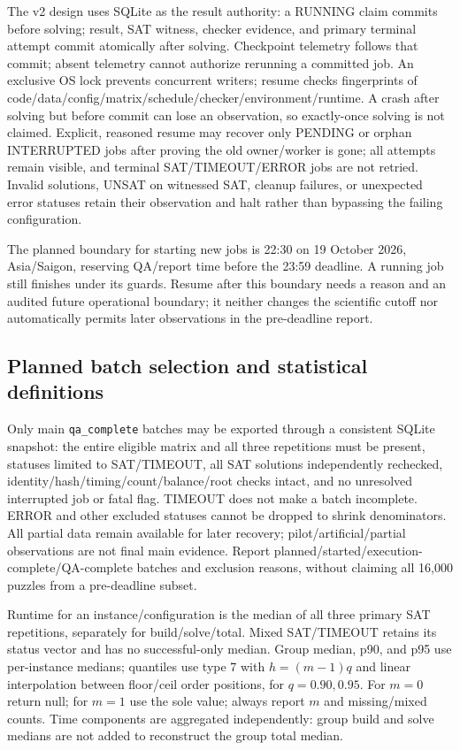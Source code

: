 The v2 design uses SQLite as the result authority: a RUNNING claim commits
before solving; result, SAT witness, checker evidence, and primary terminal
attempt commit atomically after solving. Checkpoint telemetry follows that
commit; absent telemetry cannot authorize rerunning a committed job. An
exclusive OS lock prevents concurrent writers; resume checks fingerprints
of code/data/config/matrix/schedule/checker/environment/runtime. A crash after
solving but before commit can lose an observation, so exactly-once solving
is not claimed. Explicit, reasoned resume may recover only PENDING or orphan
INTERRUPTED jobs after proving the old owner/worker is gone; all attempts
remain visible, and terminal SAT/TIMEOUT/ERROR jobs are not retried. Invalid
solutions, UNSAT on witnessed SAT, cleanup failures, or unexpected error
statuses retain their observation and halt rather than bypassing the failing
configuration.

The planned boundary for starting new jobs is 22:30 on 19 October 2026,
Asia/Saigon, reserving QA/report time before the 23:59 deadline. A running
job still finishes under its guards. Resume after this boundary needs a
reason and an audited future operational boundary; it neither changes the
scientific cutoff nor automatically permits later observations in the
pre-deadline report.

\subsection{Planned batch selection and statistical definitions}
Only main \texttt{qa\_complete} batches may be exported through a consistent
SQLite snapshot: the entire eligible matrix and all three repetitions must
be present, statuses limited to SAT/TIMEOUT, all SAT solutions independently
rechecked, identity/hash/timing/count/balance/root checks intact, and no
unresolved interrupted job or fatal flag. TIMEOUT does not make a batch
incomplete. ERROR and other excluded statuses cannot be dropped to shrink
denominators. All partial data remain available for later recovery;
pilot/artificial/partial observations are not final main evidence. Report
planned/started/execution-complete/QA-complete batches and exclusion reasons,
without claiming all 16,000 puzzles from a pre-deadline subset.

Runtime for an instance/configuration is the median of all three primary SAT
repetitions, separately for build/solve/total. Mixed SAT/TIMEOUT retains its
status vector and has no successful-only median. Group median, p90, and p95
use per-instance medians; quantiles use type 7 with $h=(m-1)q$ and linear
interpolation between floor/ceil order positions, for $q=0.90,0.95$.
For $m=0$ return null; for $m=1$ use the sole value; always report $m$ and
missing/mixed counts. Time components are aggregated independently: group
build and solve medians are not added to reconstruct the group total median.


